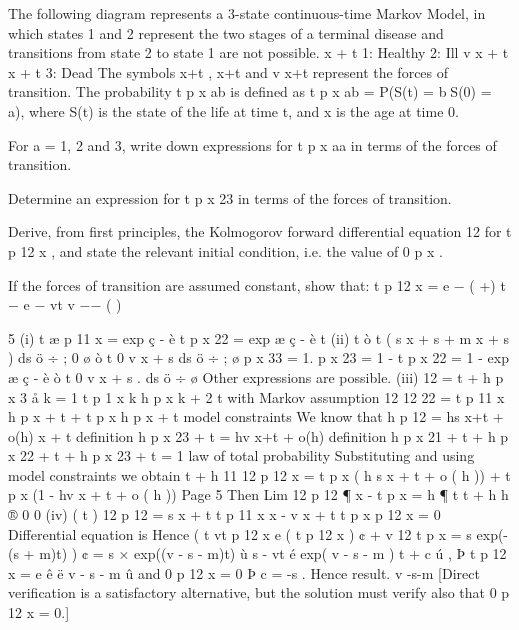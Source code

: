 \documentclass[a4paper,1pt]{article}
\begin{document}
The following diagram represents a 3-state continuous-time Markov Model, in
which states 1 and 2 represent the two stages of a terminal disease and
transitions from state 2 to state 1 are not possible.
\sigma  x + t
1: Healthy
2: Ill
v x + t
\mu x + t
3: Dead
The symbols \sigma  x+t , \mu x+t and v x+t represent the forces of transition. The probability
t
p x ab is defined as
t
p x ab = P(S(t) = bS(0) = a),
where S(t) is the state of the life at time t, and x is the age at time 0.
\item  For a = 1, 2 and 3, write down expressions for t p x aa in terms of the forces of
transition.

\item  Determine an expression for t p x 23 in terms of the forces of transition.
\item  Derive, from first principles, the Kolmogorov forward differential equation
12
for t p 12
x , and state the relevant initial condition, i.e. the value of 0 p x . 
\item  If the forces of transition are assumed constant, show that:
t
p 12
x =
\sigma 
e − ( \sigma +\mu ) t − e − vt
v −\sigma −\mu
(
)

5
(i)
t æ
p 11
x = exp ç -
è
t p x 22 = exp æ ç -
è
t
(ii)
t
ò
t
( s x + s + m x + s ) ds ö ÷ ;
0
ø
ò
t
0
v x + s ds ö ÷ ;
ø
p x 33 = 1.
p x 23 = 1 - t p x 22 = 1 - exp æ ç -
è
ò
t
0
v x + s . ds ö ÷
ø
Other expressions are possible.
(iii)
12
=
t + h p x
3
å
k = 1
t
p 1 x k h p x k + 2 t with Markov assumption
12
12
22
= t p 11
x h p x + t + t p x h p x + t model constraints
We know that
h p 12
= hs x+t + o(h)
x + t definition
h p x 23 + t = hv x+t + o(h) definition
h p x 21 + t + h p x 22 + t + h p x 23 + t = 1 law of total probability
Substituting and using model constraints we obtain
t + h
11
12
p 12
x = t p x ( h s x + t + o ( h )) + t p x (1 - hv x + t + o ( h ))
Page 5 %
Then
Lim
12
p 12
¶
x - t p x
=
h
¶ t
t + h
h ® 0
0
(iv)
(
t
)
12
p 12
= s x + t t p 11
x
x - v x + t t p x
p 12
x = 0
Differential equation is
Hence
(
t
vt
p 12
x e
(
t
p 12
x
) ¢ + v
12
t p x
= s exp(-(s + m)t)
) ¢ = s × exp((v - s - m)t)
ù
s
- vt é
exp{( v - s - m ) t } + c ú ,
Þ t p 12
x = e
ê
ë v - s - m
û
and 0 p 12
x = 0 Þ c =
-s
. Hence result.
v -s-m
[Direct verification is a satisfactory alternative, but the solution must
verify also that 0 p 12
x = 0.]
\end{document}
